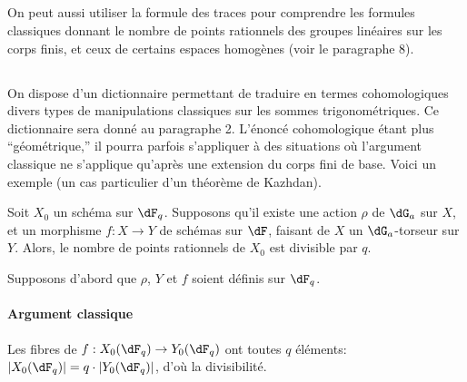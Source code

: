 \subsection{}\label{VI:1-11}

On peut aussi utiliser la formule des traces pour comprendre les formules 
classiques donnant le nombre de points rationnels des groupes linéaires sur 
les corps finis, et ceux de certains espaces homogènes (voir le paragraphe 
8). 





\subsection{}\label{VI:1-12}

On dispose d'un dictionnaire permettant de traduire en termes cohomologiques 
divers types de manipulations classiques sur les sommes 
trigonométriques. Ce dictionnaire sera donné au paragraphe 2. L'énoncé 
cohomologique étant plus ``géométrique,'' il pourra parfois s'appliquer 
à des situations où l'argument classique ne s'applique qu'après une 
extension du corps fini de base. Voici un exemple (un cas particulier d'un 
théorème de Kazhdan). 





\begin{theorem_}[Kazhdan]\label{VI:1-13}
Soit $X_0$ un schéma sur $\dF_q$. Supposons qu'il existe une action $\rho$ de 
$\dG_a$ sur $X$, et un morphisme $f:X\to Y$ de schémas sur $\dF$, faisant de 
$X$ un $\dG_a$-torseur sur $Y$. Alors, le nombre de points rationnels de $X_0$ 
est divisible par $q$.
\end{theorem_}

Supposons d'abord que $\rho$, $Y$ et $f$ soient définis sur $\dF_q$. 


\paragraph{Argument classique}
Les fibres de $f:X_0(\dF_q)\to Y_0(\dF_q)$ ont toutes $q$ éléments: 
$|X_0(\dF_q)| = q\cdot |Y_0(\dF_q)|$, d'où la divisibilité. 


